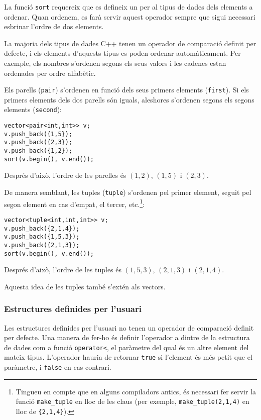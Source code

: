 
La funció \texttt{sort} requereix
que es defineix un  per al tipus de dades
dels elements a ordenar.
Quan ordenem, es farà servir aquest operador
sempre que sigui necessari esbrinar l'ordre de dos elements.

La majoria dels tipus de dades C++ tenen un operador de comparació definit
per defecte, i els elements d'aquests tipus es poden ordenar automàticament.
Per exemple, els nombres s'ordenen segons els seus valors i
les cadenes estan ordenades per ordre alfabètic.


Els parells (\texttt{pair}) s'ordenen en funció dels seus
primers elements (\texttt{first}).
Si els primers elements dels dos parells són iguals,
aleshores s'ordenen segons els segons elements (\texttt{second}):
\begin{lstlisting}
vector<pair<int,int>> v;
v.push_back({1,5});
v.push_back({2,3});
v.push_back({1,2});
sort(v.begin(), v.end());
\end{lstlisting}
Després d'això, l'ordre de les parelles és
$(1,2)$, $(1,5)$ i $(2,3)$.


De manera semblant, les tuples (\texttt{tuple})
s'ordenen pel primer element,
seguit pel segon element en cas d'empat, el tercer, etc.\footnote{
Tingueu en compte que en alguns compiladors antics,
és necessari fer servir la funció \texttt{make\_tuple} en lloc de les
claus (per exemple, \texttt{make\_tuple(2,1,4)} en lloc de \texttt{\{2,1,4\}}).}:
\begin{lstlisting}
vector<tuple<int,int,int>> v;
v.push_back({2,1,4});
v.push_back({1,5,3});
v.push_back({2,1,3});
sort(v.begin(), v.end());
\end{lstlisting}
Després d'això, l'ordre de les tuples és
$(1,5,3)$, $(2,1,3)$ i $(2,1,4)$.

Aquesta idea de les tuples també s'extén als vectors.

\subsubsection{Estructures definides per l'usuari}

Les estructures definides per l'usuari no tenen un
operador de comparació
definit per defecte.
Una manera de fer-ho és definir l'operador
a dintre de la estructura de dades com a funció
\texttt{operator<},
el paràmetre del qual és un altre element del mateix tipus.
L'operador hauria de retornar \texttt{true}
si l'element és més petit que el paràmetre,
i \texttt{false} en cas contrari.

